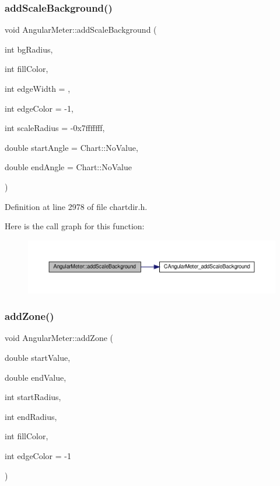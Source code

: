 \subsubsection{\texorpdfstring{add\+Scale\+Background()}{addScaleBackground()}}
{\footnotesize\ttfamily void Angular\+Meter\+::add\+Scale\+Background (\begin{DoxyParamCaption}\item[{int}]{bg\+Radius,  }\item[{int}]{fill\+Color,  }\item[{int}]{edge\+Width = {},  }\item[{int}]{edge\+Color = {\ttfamily -\/1},  }\item[{int}]{scale\+Radius = {\ttfamily -\/0x7fffffff},  }\item[{double}]{start\+Angle = {\ttfamily Chart\+:\+:NoValue},  }\item[{double}]{end\+Angle = {\ttfamily Chart\+:\+:NoValue} }\end{DoxyParamCaption})\hspace{0.3cm}{\ttfamily [inline]}}



Definition at line 2978 of file chartdir.\+h.

Here is the call graph for this function\+:
\nopagebreak
\begin{figure}[H]
\begin{center}
\leavevmode
\includegraphics[width=350pt]{class_angular_meter_a1de741912b6b62a24f7d197b4717e4b6_cgraph}
\end{center}
\end{figure}
\mbox{\label{class_angular_meter_ae1f9bf540c796aeb6df17698c0019224}} 
\subsubsection{\texorpdfstring{add\+Zone()}{addZone()}\hspace{0.1cm}{\footnotesize\ttfamily [1/2]}}
{\footnotesize\ttfamily void Angular\+Meter\+::add\+Zone (\begin{DoxyParamCaption}\item[{double}]{start\+Value,  }\item[{double}]{end\+Value,  }\item[{int}]{start\+Radius,  }\item[{int}]{end\+Radius,  }\item[{int}]{fill\+Color,  }\item[{int}]{edge\+Color = {\ttfamily -\/1} }\end{DoxyParamCaption})\hspace{0.3cm}{\ttfamily [inline]}}




